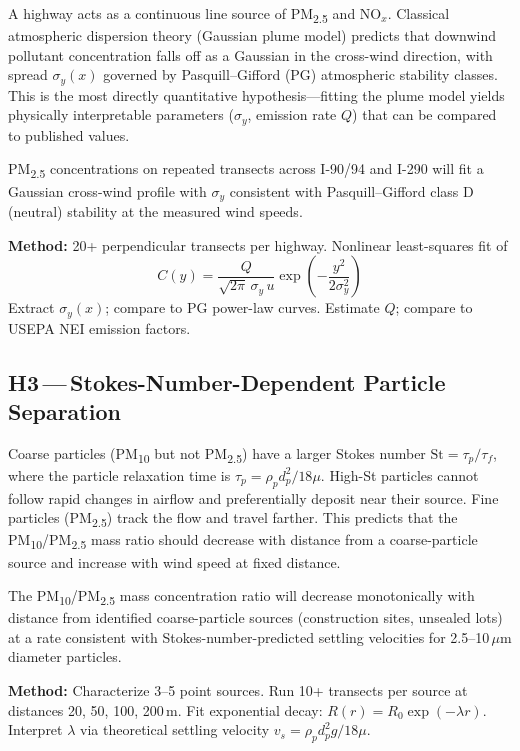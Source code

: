 \documentclass[11pt, letterpaper]{article}
\begin{document}
A highway acts as a continuous line source of PM\textsubscript{2.5} and NO$_x$. Classical
atmospheric dispersion theory (Gaussian plume model) predicts that downwind pollutant concentration
falls off as a Gaussian in the cross-wind direction, with spread $\sigma_y(x)$ governed by
Pasquill--Gifford (PG) atmospheric stability classes. This is the most directly quantitative
hypothesis---fitting the plume model yields physically interpretable parameters
($\sigma_y$, emission rate $Q$) that can be compared to published values.

\begin{tcolorbox}[callout, title={Testable Hypothesis}]
PM\textsubscript{2.5} concentrations on repeated transects across I-90/94 and I-290 will fit
a Gaussian cross-wind profile with $\sigma_y$ consistent with Pasquill--Gifford class D (neutral)
stability at the measured wind speeds.

\medskip
\textbf{Method:} 20+ perpendicular transects per highway. Nonlinear least-squares fit of
\[
  C(y) = \frac{Q}{\sqrt{2\pi}\,\sigma_y\,u}\exp\!\left(-\frac{y^2}{2\sigma_y^2}\right)
\]
Extract $\sigma_y(x)$; compare to PG power-law curves. Estimate $Q$; compare to USEPA NEI emission factors.
\end{tcolorbox}

\subsection{H3\,---\,Stokes-Number-Dependent Particle Separation}

Coarse particles (PM\textsubscript{10} but not PM\textsubscript{2.5}) have a larger Stokes number
$\mathrm{St} = \tau_p / \tau_f$, where the particle relaxation time is
$\tau_p = \rho_p d_p^2 / 18\mu$. High-St particles cannot follow rapid changes in airflow and
preferentially deposit near their source. Fine particles (PM\textsubscript{2.5}) track the flow
and travel farther. This predicts that the PM\textsubscript{10}/PM\textsubscript{2.5} mass ratio
should decrease with distance from a coarse-particle source and increase with wind speed at fixed
distance.

\begin{tcolorbox}[callout, title={Testable Hypothesis}]
The PM\textsubscript{10}/PM\textsubscript{2.5} mass concentration ratio will decrease
monotonically with distance from identified coarse-particle sources (construction sites, unsealed
lots) at a rate consistent with Stokes-number-predicted settling velocities for 2.5--10\,$\mu$m
diameter particles.

\medskip
\textbf{Method:} Characterize 3--5 point sources. Run 10+ transects per source at distances
20, 50, 100, 200\,m. Fit exponential decay: $R(r) = R_0 \exp(-\lambda r)$. Interpret $\lambda$ via
theoretical settling velocity $v_s = \rho_p d_p^2 g / 18\mu$.
\end{tcolorbox}
\end{document}
